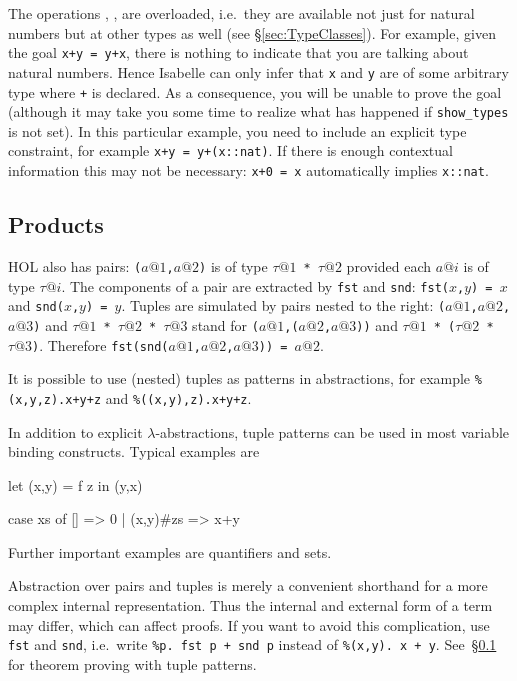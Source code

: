 \begin{warn}
  The operations \ttindexbold{+}, \ttindexbold{-}, \ttindexbold{*} are
  overloaded, i.e.\ they are available not just for natural numbers but at
  other types as well (see \S\ref{sec:TypeClasses}). For example, given
  the goal \texttt{x+y = y+x}, there is nothing to indicate that you are
  talking about natural numbers. Hence Isabelle can only infer that
  \texttt{x} and \texttt{y} are of some arbitrary type where \texttt{+} is
  declared. As a consequence, you will be unable to prove the goal (although
  it may take you some time to realize what has happened if
  \texttt{show_types} is not set).  In this particular example, you need to
  include an explicit type constraint, for example \texttt{x+y = y+(x::nat)}.
  If there is enough contextual information this may not be necessary:
  \texttt{x+0 = x} automatically implies \texttt{x::nat}.
\end{warn}


\subsection{Products}

HOL also has pairs: \texttt{($a@1$,$a@2$)} is of type \texttt{$\tau@1$ *
$\tau@2$} provided each $a@i$ is of type $\tau@i$. The components of a pair
are extracted by \texttt{fst} and \texttt{snd}:
\texttt{fst($x$,$y$) = $x$} and \texttt{snd($x$,$y$) = $y$}. Tuples
are simulated by pairs nested to the right: 
\texttt{($a@1$,$a@2$,$a@3$)} and \texttt{$\tau@1$ * $\tau@2$ * $\tau@3$}
stand for \texttt{($a@1$,($a@2$,$a@3$))} and \texttt{$\tau@1$ * ($\tau@2$ *
$\tau@3$)}. Therefore \texttt{fst(snd($a@1$,$a@2$,$a@3$)) = $a@2$}.

It is possible to use (nested) tuples as patterns in abstractions, for
example \texttt{\%(x,y,z).x+y+z} and \texttt{\%((x,y),z).x+y+z}.

In addition to explicit $\lambda$-abstractions, tuple patterns can be used in
most variable binding constructs. Typical examples are
\begin{ttbox}
let (x,y) = f z in (y,x)

case xs of [] => 0 | (x,y)\#zs => x+y
\end{ttbox}
Further important examples are quantifiers and sets.

\begin{warn}
Abstraction over pairs and tuples is merely a convenient shorthand for a more
complex internal representation.  Thus the internal and external form of a
term may differ, which can affect proofs. If you want to avoid this
complication, use \texttt{fst} and \texttt{snd}, i.e.\ write
\texttt{\%p.~fst p + snd p} instead of \texttt{\%(x,y).~x + y}.
See~\S\ref{} for theorem proving with tuple patterns.
\end{warn}


